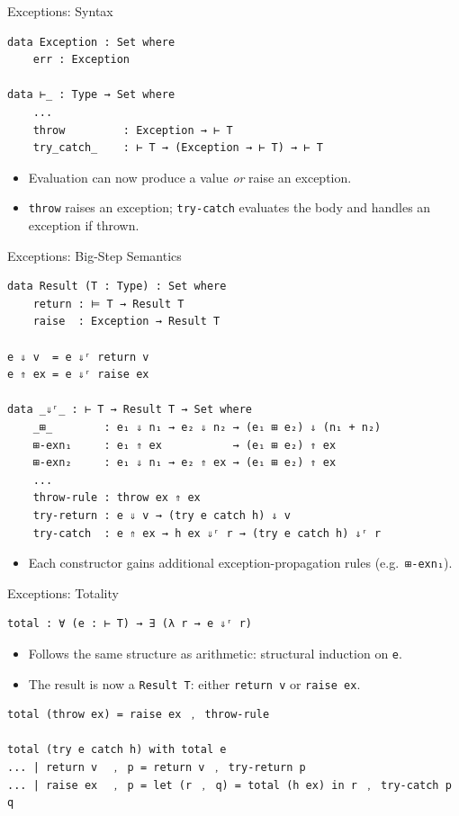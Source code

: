 \documentclass[10pt,compress,aspectratio=169]{beamer}
\begin{document}
\begin{frame}[fragile]{Exceptions: Syntax}
\begin{verbatim}
data Exception : Set where
    err : Exception

data ⊢_ : Type → Set where
    ...
    throw         : Exception → ⊢ T
    try_catch_    : ⊢ T → (Exception → ⊢ T) → ⊢ T
\end{verbatim}
\begin{itemize}
    \item Evaluation can now produce a value \emph{or} raise an exception.
    \item \texttt{throw} raises an exception; \texttt{try-catch} evaluates the body and handles an exception if thrown.
\end{itemize}
\end{frame}

\begin{frame}[fragile]{Exceptions: Big-Step Semantics}
\begin{verbatim}
data Result (T : Type) : Set where
    return : ⊨ T → Result T
    raise  : Exception → Result T

e ⇓ v  = e ⇓ʳ return v
e ⇑ ex = e ⇓ʳ raise ex

data _⇓ʳ_ : ⊢ T → Result T → Set where
    _⊞_        : e₁ ⇓ n₁ → e₂ ⇓ n₂ → (e₁ ⊞ e₂) ⇓ (n₁ + n₂)
    ⊞-exn₁     : e₁ ⇑ ex           → (e₁ ⊞ e₂) ⇑ ex
    ⊞-exn₂     : e₁ ⇓ n₁ → e₂ ⇑ ex → (e₁ ⊞ e₂) ⇑ ex
    ...
    throw-rule : throw ex ⇑ ex
    try-return : e ⇓ v → (try e catch h) ⇓ v
    try-catch  : e ⇑ ex → h ex ⇓ʳ r → (try e catch h) ⇓ʳ r 
\end{verbatim}
\begin{itemize}
    \item Each constructor gains additional exception-propagation rules (e.g.\ \texttt{⊞-exn₁}).
\end{itemize}
\end{frame}

\begin{frame}[fragile]{Exceptions: Totality}
\begin{verbatim}
total : ∀ (e : ⊢ T) → ∃ (λ r → e ⇓ʳ r)
\end{verbatim}
\begin{itemize}
    \item Follows the same structure as arithmetic: structural induction on \texttt{e}.
    \item The result is now a \texttt{Result T}: either \texttt{return v} or \texttt{raise ex}.
\end{itemize}
\vspace{0.25em}
\begin{verbatim}
total (throw ex) = raise ex ﹐ throw-rule

total (try e catch h) with total e
... | return v  ﹐ p = return v ﹐ try-return p
... | raise ex  ﹐ p = let (r ﹐ q) = total (h ex) in r ﹐ try-catch p q
\end{verbatim}
\end{frame}
\end{document}
